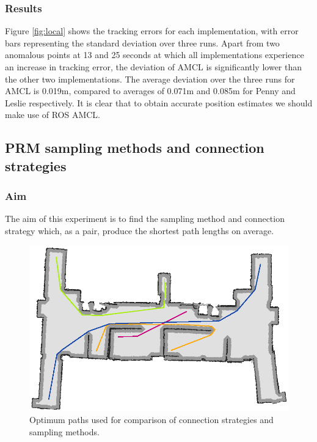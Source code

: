 \documentclass[conference]{IEEEtran}
\begin{document}
\subsubsection{Results}
Figure \ref{fig:local} shows the tracking errors for each implementation, with error bars representing the standard deviation over three runs. Apart from two anomalous points at 13 and 25 seconds at which all implementations experience an increase in tracking error, the deviation of AMCL is significantly lower than the other two implementations. The average deviation over the three runs for AMCL is 0.019m, compared to averages of 0.071m and 0.085m for Penny and Leslie respectively. It is clear that to obtain accurate position estimates we should make use of ROS AMCL.

\subsection{PRM sampling methods and connection strategies}

\subsubsection{Aim}
The aim of this experiment is to find the sampling method and connection strategy which, as a pair, produce the shortest path lengths on average.
\begin{figure}
  \includegraphics[width=\columnwidth]{optimumpaths}
  \caption{Optimum paths used for comparison of connection strategies and sampling methods.}
  \label{fig:optimum}
\end{figure}
\end{document}

